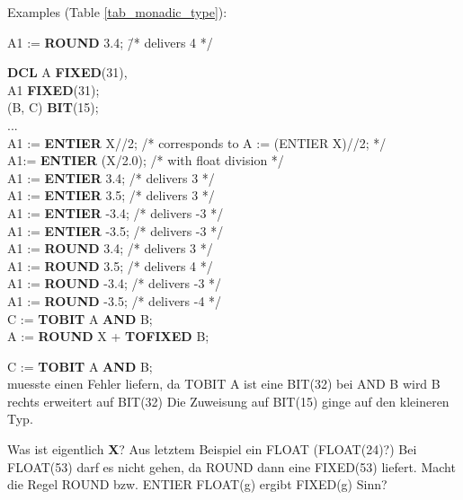 Examples (Table \ref{tab_monadic_type}):
\begin{tabbing}
A1 := {\bf ROUND} 3.4; \x \x \=  /* delivers 4 */ \kill 

{\bf DCL} A {\bf FIXED}(31),\\
\x A1 {\bf FIXED}(31);\\
\x (B, C) {\bf BIT}(15);\\
...\\
A1 := {\bf ENTIER} X//2; \> /* corresponds to A := (ENTIER X)//2; */ \\
A1:= {\bf ENTIER} (X/2.0); \> /* with float division */\\
A1 := {\bf ENTIER} 3.4; \> /* delivers 3 */ \\
A1 := {\bf ENTIER} 3.5; \> /* delivers 3 */ \\
A1 := {\bf ENTIER} -3.4; \> /* delivers -3 */ \\
A1 := {\bf ENTIER} -3.5; \> /* delivers -3 */ \\
A1 := {\bf ROUND} 3.4;  \>  /* delivers 3 */ \\
A1 := {\bf ROUND} 3.5;  \>  /* delivers 4 */ \\
A1 := {\bf ROUND} -3.4; \> /* delivers -3 */ \\
A1 := {\bf ROUND} -3.5; \> /* delivers -4 */ \\
C := {\bf TOBIT} A {\bf AND} B;\\
A := {\bf ROUND} X + {\bf TOFIXED} B;
\end{tabbing}
\begin{discuss}
C := {\bf TOBIT} A {\bf AND} B;\\
muesste einen Fehler liefern, da 
  TOBIT A ist eine BIT(32)
  bei AND B wird B rechts erweitert auf BIT(32)
  Die Zuweisung auf BIT(15) ginge auf den kleineren Typ.

  Was ist eigentlich {\bf X}?
  Aus letztem Beispiel ein FLOAT (FLOAT(24)?)
  Bei FLOAT(53) darf es nicht gehen, da ROUND dann eine FIXED(53) liefert.
  Macht die Regel ROUND bzw. ENTIER FLOAT(g) ergibt FIXED(g) Sinn?
\end{discuss}

